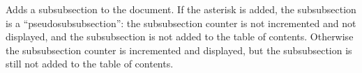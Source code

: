 Adds a subsubsection to the document.
If the asterisk is added, the subsubsection is a ``pseudosubsubsection'': the subsubsection counter is not incremented and not displayed, and the subsubsection is not added to the table of contents.
Otherwise the subsubsection counter is incremented and displayed, but the subsubsection is still not added to the table of contents.
\emacroexp

